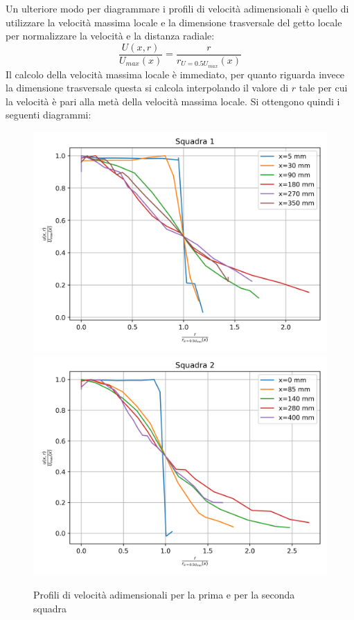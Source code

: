 \noindent Un ulteriore modo per diagrammare i profili di velocità adimensionali è quello di utilizzare la velocità massima locale e la dimensione trasversale del getto locale per normalizzare la velocità e la distanza radiale:
\begin{equation*}
    \frac{U(x,r)}{U_{max}(x)} = \frac{r}{r_{U=0.5U_{max}}(x)}
\end{equation*}
Il calcolo della velocità massima locale è immediato, per quanto riguarda invece la dimensione trasversale questa si calcola interpolando il valore di $r$ tale per cui la velocità è pari alla metà della velocità massima locale. Si ottengono quindi i seguenti diagrammi:
\begin{figure}[H]
    \centering
    \includegraphics[width=.7\textwidth]{images/3/sq1umax.png}
    \includegraphics[width=.7\textwidth]{images/3/sq2umax.png}
    \caption{Profili di velocità adimensionali per la prima e per la seconda squadra}
\end{figure}
